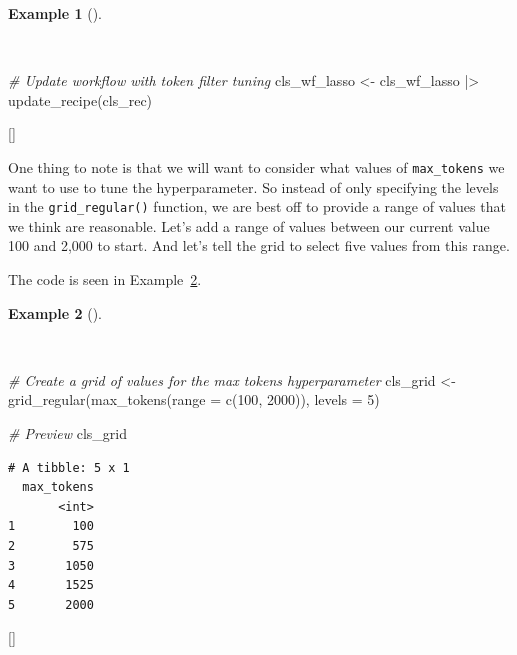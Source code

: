 \documentclass[
  letterpaper,
  krantz1]{latex/krantz-mod}
\newenvironment{Shaded}{\begin{snugshade}}{\end{snugshade}}
\newcommand{\AttributeTok}[1]{\textcolor[rgb]{0.00,0.00,0.00}{#1}}
\newcommand{\CommentTok}[1]{\textcolor[rgb]{0.00,0.00,0.00}{\textit{#1}}}
\newcommand{\DecValTok}[1]{\textcolor[rgb]{0.00,0.00,0.00}{#1}}
\newcommand{\FunctionTok}[1]{\textcolor[rgb]{0.00,0.00,0.00}{#1}}
\newcommand{\NormalTok}[1]{\textcolor[rgb]{0.00,0.00,0.00}{#1}}
\newcommand{\OtherTok}[1]{\textcolor[rgb]{0.00,0.00,0.00}{#1}}
\newcommand{\SpecialCharTok}[1]{\textcolor[rgb]{0.00,0.00,0.00}{#1}}
\newcommand{\cindex}[1]{%
  \StrSubstitute{#1}{_}{\_}[\temp]%
  \index{\temp}%
}
\theoremstyle{definition}
\theoremstyle{definition}
\newtheorem{example}{Example}[chapter]
\theoremstyle{remark}
\begin{document}
\begin{example}[]\protect\hypertarget{exm-predict-class-tune-hyperparameters-update-rec}{}\label{exm-predict-class-tune-hyperparameters-update-rec}

~

\begin{Shaded}
\begin{Highlighting}[numbers=left,,]
\CommentTok{\# Update workflow with token filter tuning}
\NormalTok{cls\_wf\_lasso }\OtherTok{\textless{}{-}}
\NormalTok{  cls\_wf\_lasso }\SpecialCharTok{|\textgreater{}}
  \FunctionTok{update\_recipe}\NormalTok{(cls\_rec)}
\end{Highlighting}
\end{Shaded}

 \cindex{update_recipe()}

\end{example}

One thing to note is that we will want to consider what values of
\texttt{max\_tokens} we want to use to tune the hyperparameter. So
instead of only specifying the levels in the \texttt{grid\_regular()}
function, we are best off to provide a range of values that we think are
reasonable. Let's add a range of values between our current value 100
and 2,000 to start. And let's tell the grid to select five values from
this range.

The code is seen in
Example~\ref{exm-predict-class-tune-hyperparameters-tokenfilter-grid}.

\pagebreak

\begin{example}[]\protect\hypertarget{exm-predict-class-tune-hyperparameters-tokenfilter-grid}{}\label{exm-predict-class-tune-hyperparameters-tokenfilter-grid}

~

\begin{Shaded}
\begin{Highlighting}[numbers=left,,]
\CommentTok{\# Create a grid of values for the max tokens hyperparameter}
\NormalTok{cls\_grid }\OtherTok{\textless{}{-}}
  \FunctionTok{grid\_regular}\NormalTok{(}\FunctionTok{max\_tokens}\NormalTok{(}\AttributeTok{range =} \FunctionTok{c}\NormalTok{(}\DecValTok{100}\NormalTok{, }\DecValTok{2000}\NormalTok{)), }\AttributeTok{levels =} \DecValTok{5}\NormalTok{)}

\CommentTok{\# Preview}
\NormalTok{cls\_grid}
\end{Highlighting}
\end{Shaded}

\begin{verbatim}
# A tibble: 5 x 1
  max_tokens
       <int>
1        100
2        575
3       1050
4       1525
5       2000
\end{verbatim}

 \cindex{grid_regular()}

\end{example}
\end{document}
